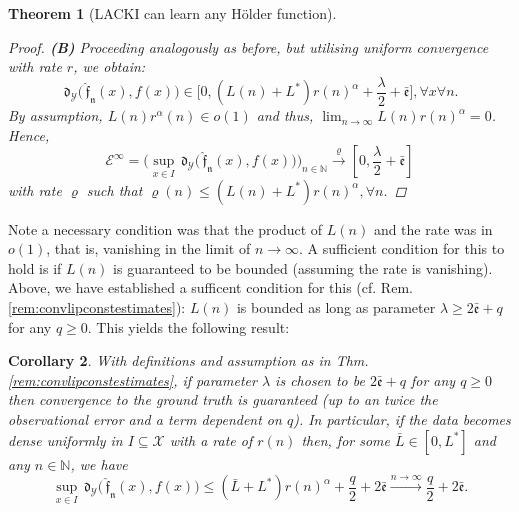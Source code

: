 \documentclass{article} %
\newtheorem{thm}{Theorem}[section]
\newtheorem{cor}[thm]{Corollary}
\theoremstyle{definition}
\theoremstyle{remark}
\newcommand{\nat}{\mathbb N}
\newcommand{\inspace}{\ensuremath{ \mathcal X}}
\newcommand{\outspace}{\ensuremath{ \mathcal Y}}
\newcommand{\metric}{\, \mathfrak{d}} %
\newcommand{\predfn}{\, \mathfrak{  \hat f_n}} %
\newcommand{\hexp}{{ \alpha }}%
\newcommand{\hestthresh}{\ensuremath{ \lambda}}
\newcommand{\obserrbnd}{\bar{\mathfrak e}}
\newcommand{\seq}[2]{\ensuremath{\bigl(#1\bigr)_{#2}}}
\newcommand{\convto}{\longrightarrow}
\newcommand{\errmetric}{\mathcal E} %
\begin{document}
\begin{thm}[LACKI can learn any H\"older function]
\begin{proof}
\textbf{(B)} Proceeding analogously as before, but utilising uniform convergence with rate $r$, we obtain:  \begin{equation} 
\metric_\outspace\bigl(\predfn(x) , f(x)\bigr)  \in \bigl[0, (L(n)+ L^*) r(n)^\hexp +  \frac \lambda 2 +\obserrbnd \bigr], \forall x \forall n. \end{equation} 
By assumption,  $L(n) r^\hexp(n) \in o(1)$ and thus, $\lim_{n \to \infty} L(n) r(n)^\hexp = 0$. Hence,  $$\errmetric^\infty = \seq{\sup_{x \in I} \metric_\outspace\bigl(\predfn(x) , f(x)\bigr) }{n \in \nat} \stackrel{\varrho}{\convto} [0, \frac \lambda 2 +\obserrbnd] $$ with rate $\varrho $ such that $\varrho(n) \leq (L(n)+ L^*) r(n)^\hexp, \forall n$.

\end{proof}
\end{thm}

Note a necessary condition was that the product of $L(n)$ and the rate was in $o(1)$, that is, vanishing in the limit of $n \to \infty$. A sufficient condition for this to hold is if $L(n)$ is guaranteed to be bounded (assuming the rate is vanishing). Above, we have established a sufficent condition for this (cf. Rem. \ref{rem:convlipconstestimates}): $L(n)$ is bounded as long as parameter $\hestthresh \geq 2 \obserrbnd + q$ for any $q \geq 0$. This yields the following result:

\begin{cor}
With definitions and assumption as in Thm. \ref{rem:convlipconstestimates}, if parameter $\hestthresh $ is chosen to be $2 \obserrbnd + q $ for any $q \geq 0$ then convergence to the ground truth is guaranteed (up to an twice the observational error and a term dependent on $q$). In particular, if the data becomes dense uniformly in $I \subseteq \inspace$ with a rate of $r(n)$  then, for some $\bar L \in [0,L^*]$ and any $n \in \nat$, we have 
\begin{equation}
\sup_{x \in I} \metric_\outspace\bigl(\predfn(x) , f(x)\bigr) \leq (\bar L+ L^*) r(n)^\hexp +  \frac { q} 2 +2 \obserrbnd  \stackrel{n \to \infty}{\convto}  \frac q 2 + 2  \obserrbnd . \end{equation} 
\label{cor:worstcaseconvhoeldertarget}
\end{cor}
\end{document}
